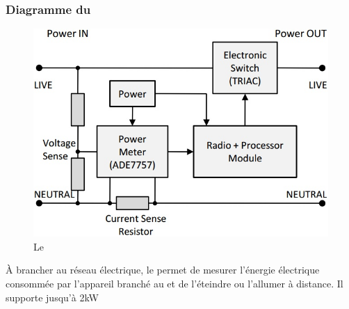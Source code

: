 \begin{frame}
 \frametitle{Diagramme du \smartsocket}
 \begin{figure}
  \centering
  \includegraphics[scale=0.35]{figures/smartsocket.jpg}
  \caption{Le \smartsocket}
 \end{figure} 
 À brancher au réseau électrique, le \smartsocket permet de mesurer l'énergie électrique consommée par l'appareil branché au \smartsocket et de l'éteindre ou l'allumer à distance.
 Il supporte jusqu'à 2kW\\
\end{frame}

